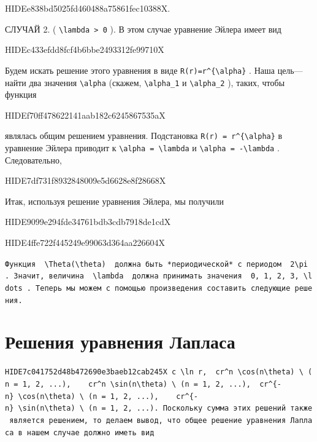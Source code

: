 \documentclass[
  ukrainian,
]{article}
\begin{document}
HIDEe838bd5025fd460488a75861fec10388X.

СЛУЧАЙ 2. ( \texttt{\textbackslash{}lambda\ \textgreater{}\ 0} ). В этом
случае уравнение Эйлера имеет вид

HIDEc433efdd8fcf4b6bbe2493312fe99710X

Будем искать решение этого уравнения в виде
\texttt{R(r)=r\^{}\{\textbackslash{}alpha\}} . Наша цель---найти два
значения \texttt{\textbackslash{}alpha} (скажем,
\texttt{\textbackslash{}alpha\_1} и \texttt{\textbackslash{}alpha\_2} ),
таких, чтобы функция

HIDEf70ff478622141aab182c6245867535aX

являлась общим решением уравнения. Подстановка
\texttt{R(r)\ =\ r\^{}\{\textbackslash{}alpha\}} в уравнение Эйлера
приводит к \texttt{\textbackslash{}alpha\ =\ \textbackslash{}lambda} и
\texttt{\textbackslash{}alpha\ =\ -\textbackslash{}lambda} .
Следовательно,

HIDE7df731f8932848009e5d6628e8f28668X

Итак, используя решение уравнения Эйлера, мы получили

HIDE9099e294fde34761bdb3cdb7918de1cdX

HIDE4ffe722f445249e99063d364aa226604X

\texttt{Функция\ \ \textquotesingle{}\textbackslash{}Theta(\textbackslash{}theta)\textquotesingle{}\ \ должна\ быть\ *периодической*\ с\ периодом\ \ \textquotesingle{}2\textbackslash{}pi\textquotesingle{}\ .\ Значит,\ величина\ \ \textquotesingle{}\textbackslash{}lambda\textquotesingle{}\ \ должна\ принимать\ значения\ \ \textquotesingle{}0,\ 1,\ 2,\ 3,\ \textbackslash{}ldots\textquotesingle{}\ .\ Теперь\ мы\ можем\ с\ помощью\ произведения\ составить\ следующие\ решения.}

\section{Решения уравнения
Лапласа}\label{ux440ux435ux448ux435ux43dux438ux44f-ux443ux440ux430ux432ux43dux435ux43dux438ux44f-ux43bux430ux43fux43bux430ux441ux430}

\texttt{HIDE7c041752d48b472690e3baeb12cab245X\ \textquotesingle{}c\ \textbackslash{}ln\ r,\textquotesingle{}\ \ \textquotesingle{}cr\^{}n\ \textbackslash{}cos(n\textbackslash{}theta)\ \textbackslash{}\ (n\ =\ 1,\ 2,\ ...),\textquotesingle{}\ \ \ \ \textquotesingle{}cr\^{}n\ \textbackslash{}sin(n\textbackslash{}theta)\ \textbackslash{}\ (n\ =\ 1,\ 2,\ ...),\textquotesingle{}\ \ \textquotesingle{}cr\^{}\{-n\}\ \textbackslash{}cos(n\textbackslash{}theta)\ \textbackslash{}\ (n\ =\ 1,\ 2,\ ...),\textquotesingle{}\ \ \ \ \textquotesingle{}cr\^{}\{-n\}\ \textbackslash{}sin(n\textbackslash{}theta)\ \textbackslash{}\ (n\ =\ 1,\ 2,\ ...).\textquotesingle{}\ Поскольку\ сумма\ этих\ решений\ также\ является\ решением,\ то\ делаем\ вывод,\ что\ общее\ решение\ уравнения\ Лапласа\ в\ нашем\ случае\ должно\ иметь\ вид}
\end{document}
